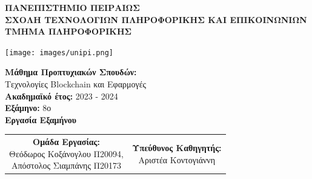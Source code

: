 \documentclass[12pt]{article}
\begin{document}
\begin{titlingpage}
    \begin{center}
        \vspace*{1in}
        \textbf{\Large ΠΑΝΕΠΙΣΤΗΜΙΟ ΠΕΙΡΑΙΩΣ} \\[2mm]
        \textbf {\large ΣΧΟΛΗ ΤΕΧΝΟΛΟΓΙΩΝ ΠΛΗΡΟΦΟΡΙΚΗΣ ΚΑΙ ΕΠΙΚΟΙΝΩΝΙΩΝ} \\[2mm]
        \textbf{\large ΤΜΗΜΑ ΠΛΗΡΟΦΟΡΙΚΗΣ}
    
        \vspace{5mm}
    
        \texttt{[image: images/unipi.png]}
        
        \vspace{8mm}
        
        \textbf{\large Μάθημα Προπτυχιακών Σπουδών:} \\
        \large Τεχνολογίες Blockchain και Εφαρμογές \\
        \vspace{3mm}
        \textbf{\large Ακαδημαϊκό έτος:} 2023 - 2024 \\
        \vspace{3mm}
        \textbf{\large Εξάμηνο:} 8ο \\
        \vspace{3mm}
        \textbf{\large Εργασία Εξαμήνου}
    
        \vspace{60mm}
    
        \begin{tabular}{|c|c|}
            \hline
                \multirow{3}{*}{\parbox{7cm}{\textbf{Ομάδα Εργασίας:}\\Θεόδωρος Κοξάνογλου Π20094,\\ Απόστολος Σιαμπάνης Π20173}} & 
                \multirow{3}{*}{\parbox{7cm}{\textbf{Υπεύθυνος Καθηγητής:}\\Αριστέα Κοντογιάννη\\}} \\
                & \\
                & \\
            \hline
        \end{tabular}
                
        \vspace*{\fill}
    \end{center}
\end{titlingpage}

\tableofcontents
\newpage
\end{document}
